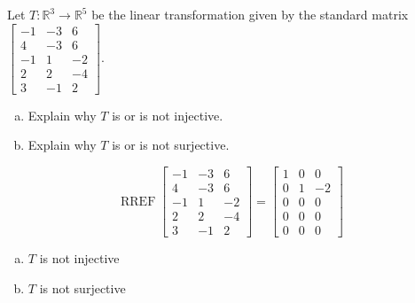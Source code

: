 
\begin{exerciseStatement}
 Let \(T:\mathbb{R}^ 3  \to \mathbb{R}^ 5 \) be the linear transformation given by the standard matrix \( \left[\begin{array}{ccc}
-1 & -3 & 6 \\
4 & -3 & 6 \\
-1 & 1 & -2 \\
2 & 2 & -4 \\
3 & -1 & 2
\end{array}\right] .\)
\begin{enumerate}[(a)]
\item Explain why \(T\) is or is not injective.
\item Explain why \(T\) is or is not surjective.
\end{enumerate}
    
\end{exerciseStatement}
    
\begin{exerciseAnswer} 


\[\operatorname{RREF} \left[\begin{array}{ccc}
-1 & -3 & 6 \\
4 & -3 & 6 \\
-1 & 1 & -2 \\
2 & 2 & -4 \\
3 & -1 & 2
\end{array}\right] = \left[\begin{array}{ccc}
1 & 0 & 0 \\
0 & 1 & -2 \\
0 & 0 & 0 \\
0 & 0 & 0 \\
0 & 0 & 0
\end{array}\right] \]


\begin{enumerate}[(a)]
\item \(T\) is not injective
\item \(T\) is not surjective
\end{enumerate}
    
\end{exerciseAnswer}
    

